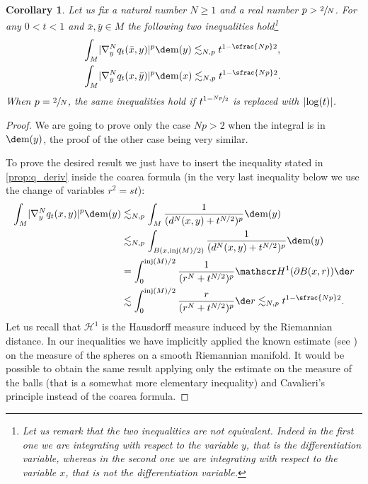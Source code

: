 \documentclass[JEP,XML,SOM,Unicode]{cedram}
\newcounter{results}[section]
\theoremstyle{plain}
\newtheorem{corollary}[results]{Corollary}
\theoremstyle{definition}
\numberwithin{equation}{section}
\newcommand{\Haus}{\ensuremath{\mathscr H}}
\renewcommand{\comma}{\ensuremath{\text{, }}}
\newcommand{\comma}{\ensuremath{\text{, }}}
\newcommand{\fullstop}{\ensuremath{\text{. }}}
\newcommand{\m}{\ensuremath{\mathrm m}}
\DeclareMathOperator{\injradius}{inj}
\DeclarePairedDelimiter\abs{\lvert}{\rvert}
\begin{document}
\begin{corollary}\label{cor:q_four}
Let us fix a natural number $N\ge 1$ and a real number $p > \sfrac2N$.
For any $0<t<1$ and $\bar x,\bar y\in M$ the following two inequalities hold\footnote{Let us remark that the
two inequalities are not equivalent. Indeed in the first one we are integrating with respect to the variable $y$, that
is the differentiation variable, whereas in the second one we are integrating with respect to the variable $x$, that
\emph{is not} the differentiation variable.}
\begin{align*}
&\int_M\abs{\nabla^N_y q_t(\bar x,y)}^p\de\m(y) \lesssim_{N,p} t^{1-\sfrac{Np}2}\comma \\
&\int_M\abs{\nabla^N_y q_t(x,\bar y)}^p\de\m(x) \lesssim_{N,p} t^{1-\sfrac{Np}2}\fullstop
\end{align*}
When $p=\sfrac2N$, the same inequalities hold if $t^{1-\sfrac{Np}2}$ is replaced with $\abs{\log(t)}$.
\end{corollary}
\begin{proof}
We are going to prove only the case $Np>2$ when the integral is in $\de\m(y)$, the proof of
the other case being very similar.

To prove the desired result we just have to insert the inequality stated in \cref{prop:q_deriv}
inside the coarea formula (in the very last inequality below we use the change of variables
$r^2=st$):
\begin{align*}
\int_M\abs{\nabla^N_y q_t(x,y)}^p\de\m(y)
&\lesssim_{N,p} \int_M\frac{1}{(d^N(x,y)+t^{N/2})^p}\de\m(y) \\
&\lesssim_{N,p} \int_{B(x,\injradius(M)/2)} \frac{1}{(d^N(x,y)+t^{N/2})^p}\de\m(y) \\
&= \int_0^{\injradius(M)/2}\frac{1}{(r^N+t^{N/2})^p}\Haus^1(\partial B(x, r))\de r \\
&\lesssim \int_0^{\injradius(M)/2}\frac{r}{(r^N+t^{N/2})^p}\de r
\lesssim_{N,p} t^{1-\sfrac{Np}2} \fullstop
\end{align*}
Let us recall that $\Haus^1$ is the Hausdorff measure induced by the Riemannian distance.
In our inequalities we have implicitly applied the known estimate (see \cite{Petersen98})
on the measure of the spheres on a smooth Riemannian manifold. It would be possible to obtain
the same result applying only the estimate on the measure of the balls (that is a somewhat
more elementary inequality) and Cavalieri's principle instead of the coarea formula.
\end{proof}
\end{document}
